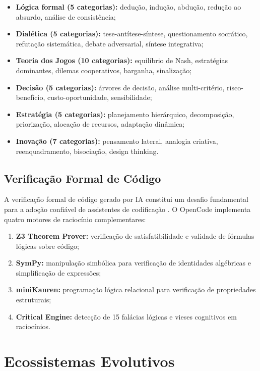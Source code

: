 \documentclass[12pt,a4paper,sumario=tradicional]{abntex2}
\begin{document}
\begin{itemize}
    \item \textbf{Lógica formal (5 categorias):} dedução, indução, abdução, redução ao absurdo, análise de consistência;
    \item \textbf{Dialética (5 categorias):} tese-antítese-síntese, questionamento socrático, refutação sistemática, debate adversarial, síntese integrativa;
    \item \textbf{Teoria dos Jogos (10 categorias):} equilíbrio de Nash, estratégias dominantes, dilemas cooperativos, barganha, sinalização;
    \item \textbf{Decisão (5 categorias):} árvores de decisão, análise multi-critério, risco-benefício, custo-oportunidade, sensibilidade;
    \item \textbf{Estratégia (5 categorias):} planejamento hierárquico, decomposição, priorização, alocação de recursos, adaptação dinâmica;
    \item \textbf{Inovação (7 categorias):} pensamento lateral, analogia criativa, reenquadramento, bisociação, design thinking.
\end{itemize}

\subsection{Verificação Formal de Código}

A verificação formal de código gerado por IA constitui um desafio fundamental para a adoção confiável de assistentes de codificação \cite{antero2024harnessing}. O OpenCode implementa quatro motores de raciocínio complementares:

\begin{enumerate}
    \item \textbf{Z3 Theorem Prover:} verificação de satisfatibilidade e validade de fórmulas lógicas sobre código;
    \item \textbf{SymPy:} manipulação simbólica para verificação de identidades algébricas e simplificação de expressões;
    \item \textbf{miniKanren:} programação lógica relacional para verificação de propriedades estruturais;
    \item \textbf{Critical Engine:} detecção de 15 falácias lógicas e vieses cognitivos em raciocínios.
\end{enumerate}

\section{Ecossistemas Evolutivos}
\end{document}
